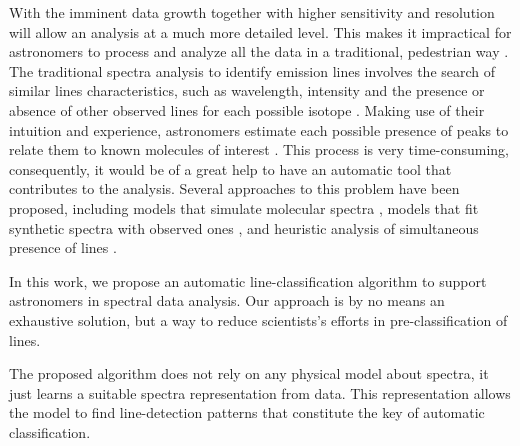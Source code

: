 With the imminent data growth together with higher sensitivity and resolution will allow an analysis at a much more detailed level.
This makes it impractical for astronomers to process and analyze all the data in a traditional, pedestrian way \citep{schilke_analysis_2011, skoda_spectroscopic_2014}.
The traditional spectra analysis to identify emission lines involves the search of similar lines characteristics, such as wavelength, intensity and the presence or absence of other observed lines for each possible isotope \citep{sharpee_introducing_2003}.
Making use of their intuition and experience, astronomers estimate each possible presence of peaks to relate them to known molecules of interest \citep{schilke_analysis_2011}.
This process is very time-consuming, consequently, it would be of a great help to have an automatic tool that contributes to the analysis.
Several approaches to this problem have been proposed, including models that simulate molecular spectra \citep{schilke_line_2001, comito_molecular_2005, maret_weeds:_2010, caux_cassis_2011, vastel_cassis_2015},  models that fit synthetic spectra with observed ones \citep{pequignot_deep_1996, walsh_deep_2003}, and heuristic analysis of simultaneous presence of lines \citep{sharpee_introducing_2003}.

In this work, we propose an automatic line-classification algorithm to support astronomers in spectral data analysis.
Our approach is by no means an exhaustive solution, but a way to reduce scientists's efforts in pre-classification of lines.

The proposed algorithm does not rely on any physical model about spectra, it just learns a suitable spectra representation from data.
This representation allows the model to find line-detection patterns that constitute the key of automatic classification.

